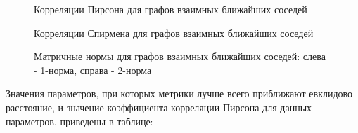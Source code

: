 \begin{figure}[!htbp]
  \begin{minipage}[h]{0.49\linewidth}
  \end{minipage}
  \hfill
  \begin{minipage}[h]{0.49\linewidth}
  \end{minipage}

  \caption{Корреляции Пирсона для графов взаимных ближайших соседей}
  \label{img:mut_graphs}  
\end{figure}

\begin{figure}[h]
  \begin{minipage}[h]{0.49\linewidth}
  \end{minipage}
  \hfill
  \begin{minipage}[h]{0.49\linewidth}
  \end{minipage}

  \caption{Корреляции Спирмена для графов взаимных ближайших соседей}
  \label{img:mut_graphs_sp}  
\end{figure}


\begin{figure}[h]
  \begin{minipage}[h]{0.49\linewidth}
  \end{minipage}
  \hfill
  \begin{minipage}[h]{0.49\linewidth}
  \end{minipage}

  \caption{Матричные нормы для графов взаимных ближайших соседей: слева - 1-норма, справа - 2-норма}
  \label{img:mut_graphs_norm}  
\end{figure}

\newpage
 Значения параметров, при которых метрики лучше всего приближают евклидово расстояние, и значение коэффициента корреляции Пирсона для данных параметров, приведены в таблице:
 
